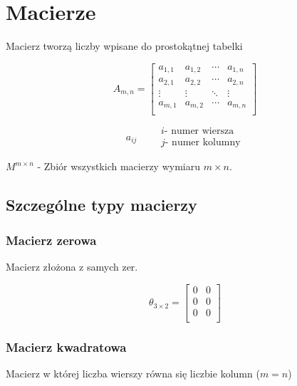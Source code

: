 \documentclass[../Matematyka.tex]{subfiles}
\begin{document}
    \section{Macierze}
    Macierz tworzą liczby wpisane do prostokątnej tabelki

    \begin{displaymath}
        A_{m,n} = 
        \begin{bmatrix}
            a_{1,1} & a_{1,2} & \cdots & a_{1,n} \\
            a_{2,1} & a_{2,2} & \cdots & a_{2,n} \\
            \vdots & \vdots & \ddots & \vdots \\
            a_{m,1} & a_{m,2} & \cdots & a_{m,n} \\
        \end{bmatrix}
    \end{displaymath}

    \begin{displaymath}
        a_{ij} \qquad
        \substack{
            i \text{- numer wiersza}\\
            j \text{- numer kolumny}
        }
    \end{displaymath}

    \(M^{m \times n}\) - Zbiór wszystkich macierzy wymiaru \(m \times n\).

    \subsection{Szczególne typy macierzy}

    \subsubsection{Macierz zerowa}
    Macierz złożona z samych zer.

    \begin{displaymath}
        \theta_{3 \times 2} =
        \begin{bmatrix}
            0 & 0 \\
            0 & 0 \\
            0 & 0 \\
        \end{bmatrix}
    \end{displaymath}

    \subsubsection{Macierz kwadratowa}
    Macierz w której liczba wierszy równa się liczbie kolumn (\(m = n\))
\end{document}

